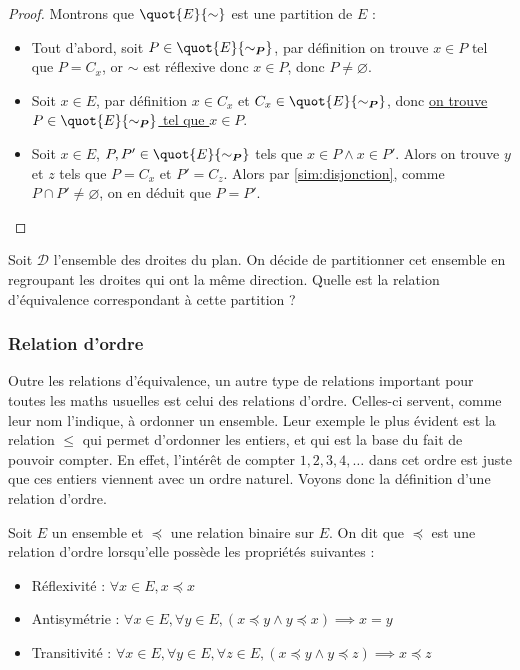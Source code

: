 \begin{proof}
    \vspace{0.5cm}
    Montrons que $\quot{E}{\sim}$ est une partition de $E$ :
    \begin{itemize}[label=$\bullet$]
        \item Tout d'abord, soit $P\in \quot{E}{\sim_{\boldsymbol P}}$, par définition on trouve $x\in P$ tel que $P=C_x$, or $\sim$ est réflexive donc $x\in P$, donc \underline{$P\neq \varnothing$}.
        \item Soit $x\in E$, par définition $x\in C_x$ et $C_x\in \quot{E}{\sim_{\boldsymbol P}}$, donc \underline{on trouve $P\in \quot{E}{\sim_{\boldsymbol P}}$ tel que $x\in P$}.
        \item Soit $x\in E$, $P,P'\in \quot{E}{\sim_{\boldsymbol P}}$ tels que $x\in P\land x\in P'$. Alors on trouve $y$ et $z$ tels que $P=C_x$ et $P'=C_z$. Alors par \ref{sim:disjonction}, comme $P\cap P'\neq \varnothing$, on en déduit que \underline{$P=P'$}.
    \end{itemize}
\end{proof}

\begin{exo}
    Soit $\mathcal D$ l'ensemble des droites du plan. On décide de partitionner cet ensemble en regroupant les droites qui ont la même direction. Quelle est la relation d'équivalence correspondant à cette partition ?
\end{exo}

\subsubsection{Relation d'ordre}

Outre les relations d'équivalence, un autre type de relations important pour toutes les maths usuelles est celui des relations d'ordre. Celles-ci servent, comme leur nom l'indique, à ordonner un ensemble. Leur exemple le plus évident est la relation $\leq$ qui permet d'ordonner les entiers, et qui est la base du fait de pouvoir compter. En effet, l'intérêt de compter $1,2,3,4,\ldots$ dans cet ordre est juste que ces entiers viennent avec un ordre naturel. Voyons donc la définition d'une relation d'ordre.

\begin{defi}
    Soit $E$ un ensemble et $\preceq$ une relation binaire sur $E$. On dit que $\preceq$ est une relation d'ordre lorsqu'elle possède les propriétés suivantes :
    \begin{itemize}[label=]
        \item Réflexivité : $\forall x\in E, x\preceq x$
        \item Antisymétrie : $\forall x\in E, \forall y \in E, (x\preceq y \land y \preceq x)\implies x=y$
        \item Transitivité : $\forall x\in E,\forall y\in E,\forall z \in E, (x\preceq y \land y \preceq z)\implies x \preceq z$
    \end{itemize}
\end{defi}

